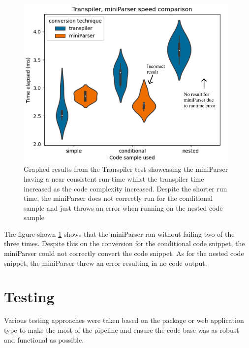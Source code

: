 \documentclass{l4proj}
\begin{document}
\begin{figure}[H]
    \centering
    \includegraphics[width=11cm]{dissertation/images/transpiler-miniParser-speed-comparison.png}
    \caption{Graphed results from the Transpiler test showcasing the miniParser having a near consistent run-time whilst the transpiler time increased as the code complexity increased. Despite the shorter run time, the miniParser does not correctly run for the conditional sample and just throws an error when running on the nested code sample }
    \label{fig:transpiler-miniparser-speed-comparison}
\end{figure}

The figure shown \ref{fig:transpiler-miniparser-speed-comparison} shows that the miniParser ran without failing two of the three times. Despite this on the conversion for the conditional code snippet, the miniParser could not correctly convert the code snippet. As for the nested code snippet, the miniParser threw an error resulting in no code output.


\section{Testing}
Various testing approaches were taken based on the package or web application type to make the most of the pipeline and ensure the code-base was as robust and functional as possible.
\end{document}
